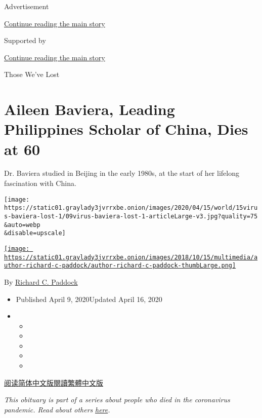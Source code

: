 Advertisement

\protect\hyperlink{after-top}{Continue reading the main story}

Supported by

\protect\hyperlink{after-sponsor}{Continue reading the main story}

Those We've Lost

\hypertarget{aileen-baviera-leading-philippines-scholar-of-china-dies-at-60}{%
\section{Aileen Baviera, Leading Philippines Scholar of China, Dies at
60}\label{aileen-baviera-leading-philippines-scholar-of-china-dies-at-60}}

Dr. Baviera studied in Beijing in the early 1980s, at the start of her
lifelong fascination with China.

\texttt{[image: https://static01.graylady3jvrrxbe.onion/images/2020/04/15/world/15virus-baviera-lost-1/09virus-baviera-lost-1-articleLarge-v3.jpg?quality=75\\\&auto=webp\\\&disable=upscale]}

\href{https://www.nytimes3xbfgragh.onion/by/richard-c-paddock}{\texttt{[image: https://static01.graylady3jvrrxbe.onion/images/2018/10/15/multimedia/author-richard-c-paddock/author-richard-c-paddock-thumbLarge.png]}}

By
\href{https://www.nytimes3xbfgragh.onion/by/richard-c-paddock}{Richard
C. Paddock}

\begin{itemize}
\item
  Published April 9, 2020Updated April 16, 2020
\item
  \begin{itemize}
  \item
  \item
  \item
  \item
  \item
  \end{itemize}
\end{itemize}

\href{https://cn.nytimes3xbfgragh.onion/obits/20200410/aileen-baviera-dead-coronavirus/}{阅读简体中文版}\href{https://cn.nytimes3xbfgragh.onion/obits/20200410/aileen-baviera-dead-coronavirus/zh-hant/}{閱讀繁體中文版}

\emph{This obituary is part of a series about people who died in the
coronavirus pandemic. Read about others}
\href{https://www.nytimes3xbfgragh.onion/series/people-who-have-died-of-the-coronavirus}{\emph{here}}\emph{.}

